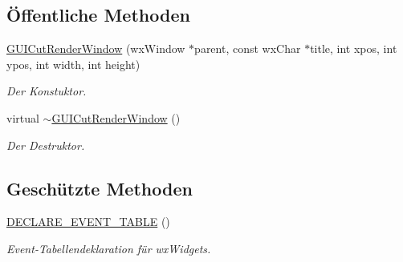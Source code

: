 \subsection*{Öffentliche Methoden}
\begin{DoxyCompactItemize}
\item 
\hyperlink{classGUICutRenderWindow_ae522616f2d98dd3455a1d6dcc4ee877f}{G\-U\-I\-Cut\-Render\-Window} (wx\-Window $\ast$parent, const wx\-Char $\ast$title, int xpos, int ypos, int width, int height)
\begin{DoxyCompactList}\small\item\em Der Konstuktor. \end{DoxyCompactList}\item 
virtual \hyperlink{classGUICutRenderWindow_aced4a67c460b8c3ede40763b6da6953d}{$\sim$\-G\-U\-I\-Cut\-Render\-Window} ()
\begin{DoxyCompactList}\small\item\em Der Destruktor. \end{DoxyCompactList}\end{DoxyCompactItemize}
\subsection*{Geschützte Methoden}
\begin{DoxyCompactItemize}
\item 
\hyperlink{classGUICutRenderWindow_a3eda2915b515c63309d996a9c1dc6442}{D\-E\-C\-L\-A\-R\-E\-\_\-\-E\-V\-E\-N\-T\-\_\-\-T\-A\-B\-L\-E} ()
\begin{DoxyCompactList}\small\item\em Event-\/\-Tabellendeklaration für wx\-Widgets. \end{DoxyCompactList}\end{DoxyCompactItemize}
